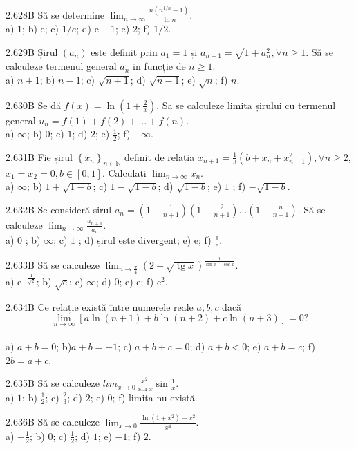 \documentclass[11pt]{article}
\begin{document}
2.628B Să se determine $\lim _{n \rightarrow \infty} \frac{n\left(n^{1 / n}-1\right)}{\ln n}$.\\ a) $1$; b) $\mathrm{e}$; c) $1 / e$; d) $\mathrm{e}-1$; e) $2$; f) $1 / 2$.

2.629B Șirul $\left(a_{n}\right)$ este definit prin $a_{1}=1$ și $a_{n+1}=\sqrt{1+a_{n}^{2}}, \forall n \geq 1$. Să se calculeze termenul general $a_{n}$ in funcție de $n \geq 1$.\\ a) $n+1$; b) $n-1$; c) $\sqrt{n+1}$; d) $\sqrt{n-1}$; e) $\sqrt{n}$; f) $n$.

2.630B Se dă $f(x)=\ln \left(1+\frac{2}{x}\right)$. Să se calculeze limita șirului cu termenul general $u_{n}=f(1)+f(2)+\ldots+f(n)$.\\ a) $\infty$; b) $0$; c) $1$; d) $2$; e) $\frac{1}{2}$; f) $-\infty$.

2.631B Fie șirul $\left\{x_{n}\right\}_{n \in \mathbb{N}}$ definit de relația $x_{n+1}=\frac{1}{3}\left(b+x_{n}+x_{n-1}^{2}\right), \forall n \geq 2$, $x_{1}=x_{2}=0, b \in[0,1]$. Calculați $\lim _{n \rightarrow \infty} x_{n}$.\\ a) $\infty$; b) $1+\sqrt{1-b}$; c) $1-\sqrt{1-b}$; d) $\sqrt{1-b}$; e) $1$ ; f) $-\sqrt{1-b}$.

2.632B Se consideră șirul $a_{n}=\left(1-\frac{1}{n+1}\right)\left(1-\frac{2}{n+1}\right) \ldots\left(1-\frac{n}{n+1}\right)$. Să se calculeze $\lim _{n \rightarrow \infty} \frac{a_{n+1}}{a_{n}}$.\\ a) $0$ ; b) $\infty$; c) $1$ ; d) șirul este divergent; e) $\mathrm{e}$; f) $\frac{1}{\mathrm{e}}$.

2.633B Să se calculeze $\lim _{n \rightarrow \frac{\pi}{4}} (2-\sqrt{\operatorname{tg} x})^{\frac{1}{\sin x - \cos x}}$.\\ a) $\mathrm{e}^{-\frac{1}{\sqrt{2}}}$; b) $\sqrt{\mathrm{e}}$; c) $\infty$; d) $0$; e) $\mathrm{e}$; f) $\mathrm{e}^{2}$.

2.634B Ce relație există între numerele reale $a,b,c$ dacă $$\lim_{n \rightarrow \infty} \left[ a \ln(n+1) + b \ln(n+2) + c \ln(n+3) \right] = 0?$$\\ a) $a+b=0$; b)$a+b=-1$; c) $a+b+c=0$; d) $a+b<0$; e) $a+b=c$; f) $2 b=a+c$.

2.635B Să se calculeze $lim_{x \rightarrow 0} \frac{x^{2}}{\sin x} \sin{\frac{1}{x}}$.\\ a) $1$; b) $\frac{1}{2}$; c) $\frac{2}{3}$; d) $2$; e) $0$; f) limita nu există.

2.636B Să se calculeze $\lim_{x \rightarrow 0} \frac{\ln(1+x^{2})-x^{2}}{x^{4}}$.\\ a) $-\frac{1}{2}$; b) $0$; c) $\frac{1}{2}$; d) $1$; e) $-1$; f) $2$.
\end{document}

